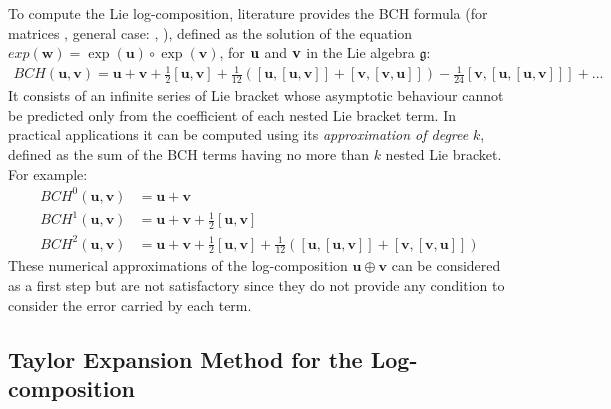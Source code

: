 To compute the Lie log-composition, literature provides the BCH formula (for matrices \cite{hall2015lie}, general case: \cite{klarsfeld1989baker} , \cite{serre2009lie}), defined as the solution of the equation $exp(\mathbf{w}) = \exp(\mathbf{u}) \circ \exp(\mathbf{v})$, for $\bf{u}$ and $\bf{v}$ in the Lie algebra $\mathfrak{g}$:
\begin{align}\label{eq:bch_definition}
	BCH(\mathbf{u},\mathbf{v}) 
	= 
	\mathbf{u} + \mathbf{v} + \frac{1}{2}[\mathbf{u},\mathbf{v}] + \frac{1}{12}([\mathbf{u},[\mathbf{u},\mathbf{v}]]
	+ [\mathbf{v},[\mathbf{v},\mathbf{u}]]) - \frac{1}{24}[\mathbf{v},[\mathbf{u},[\mathbf{u},\mathbf{v}]]] +... 
\end{align}
It consists of an infinite series of Lie bracket whose asymptotic behaviour cannot be predicted only from the coefficient of each nested Lie bracket term. In practical applications it can be computed using its \emph{approximation of degree} $k$, defined as the sum of the BCH terms having no more than $k$ nested Lie bracket. For example:
\begin{align*}
BCH^{0}(\mathbf{u},\mathbf{v}) &= \mathbf{u} + \mathbf{v} \\
BCH^{1}(\mathbf{u},\mathbf{v}) &=  \mathbf{u} + \mathbf{v} + \frac{1}{2}[\mathbf{u},\mathbf{v}] \\
BCH^{2}(\mathbf{u},\mathbf{v}) &=  \mathbf{u} + \mathbf{v} + \frac{1}{2}[\mathbf{u},\mathbf{v}] + \frac{1}{12}([\mathbf{u},[\mathbf{u},\mathbf{v}]] + [\mathbf{v},[\mathbf{v},\mathbf{u}]])
\end{align*}
These numerical approximations of the log-composition $\mathbf{u}\oplus \mathbf{v}$ can be considered as a first step but are not satisfactory since they do not provide any condition to consider the error carried by each term.


\subsection{Taylor Expansion Method for the Log-composition}\label{se:taylor_expansion}

